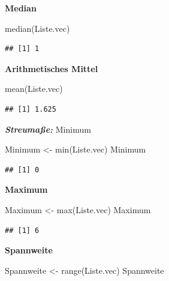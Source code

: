 \documentclass[
]{article}
\newenvironment{Shaded}{\begin{snugshade}}{\end{snugshade}}
\newcommand{\FunctionTok}[1]{\textcolor[rgb]{0.00,0.00,0.00}{#1}}
\newcommand{\NormalTok}[1]{#1}
\newcommand{\OtherTok}[1]{\textcolor[rgb]{0.56,0.35,0.01}{#1}}
\begin{document}
\textbf{Median}

\begin{Shaded}
\begin{Highlighting}[]
\FunctionTok{median}\NormalTok{(Liste.vec)}
\end{Highlighting}
\end{Shaded}

\begin{verbatim}
## [1] 1
\end{verbatim}

\textbf{Arithmetisches Mittel}

\begin{Shaded}
\begin{Highlighting}[]
\FunctionTok{mean}\NormalTok{(Liste.vec)}
\end{Highlighting}
\end{Shaded}

\begin{verbatim}
## [1] 1.625
\end{verbatim}

\hfill\break
\textbf{\emph{Streumaße:}} Minimum

\begin{Shaded}
\begin{Highlighting}[]
\NormalTok{Minimum }\OtherTok{\textless{}{-}} \FunctionTok{min}\NormalTok{(Liste.vec)}
\NormalTok{Minimum}
\end{Highlighting}
\end{Shaded}

\begin{verbatim}
## [1] 0
\end{verbatim}

\textbf{Maximum}

\begin{Shaded}
\begin{Highlighting}[]
\NormalTok{Maximum }\OtherTok{\textless{}{-}} \FunctionTok{max}\NormalTok{(Liste.vec)}
\NormalTok{Maximum}
\end{Highlighting}
\end{Shaded}

\begin{verbatim}
## [1] 6
\end{verbatim}

\textbf{Spannweite}

\begin{Shaded}
\begin{Highlighting}[]
\NormalTok{Spannweite }\OtherTok{\textless{}{-}} \FunctionTok{range}\NormalTok{(Liste.vec)}
\NormalTok{Spannweite}
\end{Highlighting}
\end{Shaded}
\end{document}
